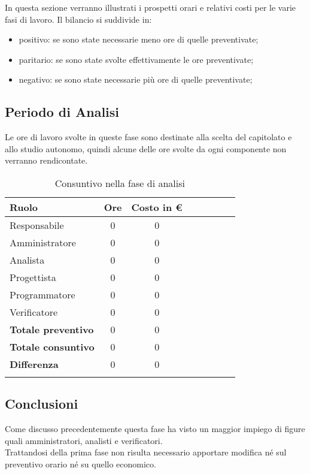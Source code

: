 \documentclass[../piano_di_progetto.tex]{subfiles}
\begin{document}
In questa sezione verranno illustrati i prospetti orari e relativi costi per le varie fasi di lavoro. Il bilancio si suddivide in:
\begin{itemize}
\item positivo: se sono state necessarie meno ore di quelle preventivate;
\item paritario: se sono state svolte effettivamente le ore preventivate;
\item negativo: se sono state necessarie più ore di quelle preventivate;
\end{itemize}

\subsection{ Periodo di Analisi}%
\label{sub:cons_analisi}
Le ore di lavoro svolte in queste fase sono destinate alla scelta del capitolato e allo studio autonomo, quindi alcune delle ore svolte da ogni componente non verranno rendicontate.

\begin{center}
	\begin{longtable}{|l|c|c|c|c|c|c|c|}
		\hline
		\rowcolor{lightgray}
		\textbf{Ruolo} & \textbf{Ore} & \textbf{Costo in €}\\

		\hline
		Responsabile & 0 & 0 \\
		\hline
		Amministratore & 0 & 0\\
		\hline
		Analista & 0 & 0\\
		\hline
		Progettista & 0 & 0\\
		\hline
		Programmatore & 0 & 0\\
		\hline
		Verificatore & 0 & 0\\
		\hline
		\textbf{Totale preventivo} & 0 & 0\\
		\hline
		\textbf{Totale consuntivo} & 0 & 0\\
		\hline
		\textbf{Differenza} & 0 & 0\\
		\hline	

		\caption{Consuntivo nella fase di analisi}
	\end{longtable}
\end{center}

\subsection{ Conclusioni}%
\label{sub:cons_fine}
Come discusso precedentemente questa fase ha visto un maggior impiego di figure quali amministratori, analisti e verificatori.\\
Trattandosi della prima fase non risulta necessario apportare modifica né sul preventivo orario né su quello economico. 
\end{document}
